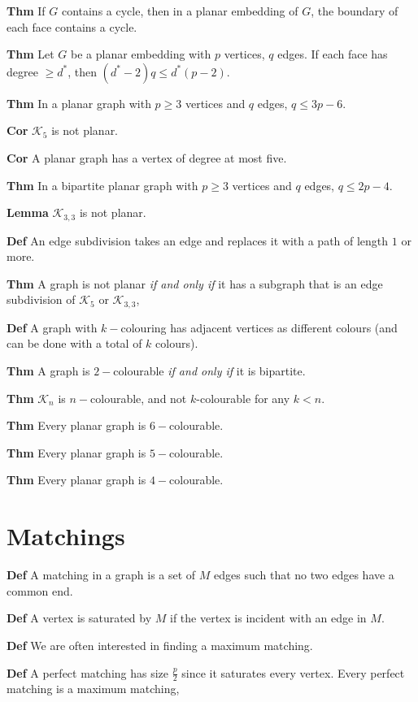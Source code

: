 \documentclass{article}
\begin{document}
\textbf{Thm} If $G$ contains a cycle, then in a planar embedding of $G$, the boundary of each face contains a cycle.

\textbf{Thm} Let $G$ be a planar embedding with $p$ vertices, $q$ edges. If each face has degree $\ge d^{*}$, then $(d^{*} - 2)q \le d^{*}(p-2)$.

\textbf{Thm} In a planar graph with $p \ge 3$ vertices and $q$ edges, $q \le 3p-6$.

\textbf{Cor} $\mathcal{K}_5$ is not planar. 

\textbf{Cor} A planar graph has a vertex of degree at most five. 

\textbf{Thm} In a bipartite planar graph with $p \ge 3$ vertices and $q$ edges, $q \le 2p - 4$. 

\textbf{Lemma} $\mathcal{K}_{3,3}$ is not planar. 

\textbf{Def} An edge subdivision takes an edge and replaces it with a path of length $1$ or more. 

\textbf{Thm} A graph is not planar \textit{if and only if} it has a subgraph that is an edge subdivision of $\mathcal{K}_5$ or $\mathcal{K}_{3,3}$, 

\textbf{Def} A graph with $k-$colouring has adjacent vertices as different colours (and can be done with a total of $k$ colours). 

\textbf{Thm} A graph is $2-$colourable \textit{if and only if} it is bipartite. 

\textbf{Thm} $\mathcal{K}_n$ is $n-$colourable, and not $k$-colourable for any $k < n$. 

\textbf{Thm} Every planar graph is $6-$colourable. 

\textbf{Thm} Every planar graph is $5-$colourable. 

\textbf{Thm} Every planar graph is $4-$colourable. 

\section{Matchings}

\textbf{Def} A matching in a graph is a set of $M$ edges such that no two edges have a common end. 

\textbf{Def} A vertex is saturated by $M$ if the vertex is incident with an edge in $M$. 

\textbf{Def} We are often interested in finding a maximum matching. 

\textbf{Def} A perfect matching has size $\frac{p}{2}$ since it saturates every vertex. Every perfect matching is a maximum matching, 
\end{document}
